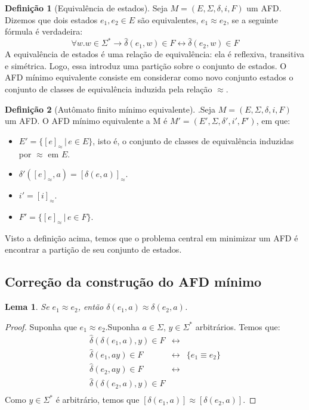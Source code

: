 \documentclass[a4paper]{article}
\newtheorem{Lemma}{Lema}
\theoremstyle{definition}
\newtheorem{Definition}{Definição}
\begin{document}
  \begin{Definition}[Equivalência de estados]
    Seja $M = (E,\Sigma,\delta,i,F)$ um AFD. Dizemos que dois estados
    $e_1,e_2 \in E$ são equivalentes, $e_1 \approx e_2$, se a seguinte
    fórmula é verdadeira:
    \[
      \forall w. w\in\Sigma^* \to \widehat{\delta}(e_1,w) \in F \leftrightarrow
      \widehat{\delta}(e_2,w) \in F
    \]
    A equivalência de estados é uma relação de equivalência: ela é reflexiva,
    transitiva e simétrica. Logo, essa introduz uma partição sobre o conjunto de
    estados. O AFD mínimo equivalente consiste em considerar como novo conjunto
    estados o conjunto de classes de equivalência induzida pela relação $\approx$.
  \end{Definition}

  \begin{Definition}[Autômato finito mínimo equivalente].\label{afdmin}
    Seja $M = (E,\Sigma,\delta,i,F)$ um AFD. O AFD mínimo equivalente a M é
    $M' = (E',\Sigma,\delta',i', F')$, em que:
    \begin{itemize}
      \item $E' = \{[e]_\approx \,|\, e \in E\}$, isto é, o conjunto de classes
        de equivalência induzidas por $\approx$ em $E$.
      \item $\delta'([e]_\approx,a) = [\delta(e,a)]_\approx$.
      \item $i' = [i]_\approx$.
      \item $F' = \{[e]_\approx\,|\,e\in F\}$.
    \end{itemize}
    Visto a definição acima, temos que o problema central em minimizar um AFD é
    encontrar a partição de seu conjunto de estados.
  \end{Definition}

  \subsection{Correção da construção do AFD mínimo}
  
  \begin{Lemma}
    Se $e_1 \approx e_2$, então $\delta(e_1,a) \approx \delta(e_2, a)$.
  \end{Lemma}
  \begin{proof}
    Suponha que $e_1\approx e_2$.Suponha $a\in \Sigma$, $y\in\Sigma^*$
    arbitrários. Temos que:
    \[
      \begin{array}{lcl}
        \widehat{\delta}(\delta(e_1,a),y)\in F & \leftrightarrow \\
        \widehat{\delta}(e_1,ay) \in F         & \leftrightarrow & \{ e_1 \equiv
                                                                   e_2\} \\
        \widehat{\delta}(e_2,ay) \in F         & \leftrightarrow \\
        \widehat{\delta}(\delta(e_2,a),y)\in F \\
        
      \end{array}
    \]
    Como $y \in \Sigma^*$ é arbitrário, temos que $[\delta(e_1,a)] \approx [\delta(e_2,a)]$.
  \end{proof}
\end{document}
